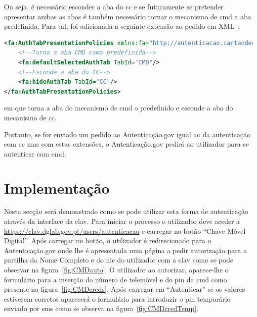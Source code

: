 Ou seja, é necessário esconder a aba do \acrfull{cc} e se futuramente se pretender apresentar ambas as abas é também necessário tornar o mecanismo de \acrfull{cmd} a aba predefinida. Para tal, foi adicionada a seguinte extensão ao pedido em XML~\cite{agov2}:
\begin{lstlisting}[language=xml, caption=Extensão Política de Apresentação no pedido enviado ao Autenticação.gov]
<fa:AuthTabPresentationPolicies xmlns:fa="http://autenticacao.cartaodecidadao.pt/presentationpolicy">
    <!--Torna a aba CMD como predefinida-->
    <fa:defaultSelectedAuthTab TabId="CMD"/>
    <!--Esconde a aba do CC-->
    <fa:hideAuthTab TabId="CC"/> 
</fa:AuthTabPresentationPolicies>
\end{lstlisting}
em que torna a aba do mecanismo de \acrshort{cmd} o predefinido e esconde a aba do mecanismo de \acrshort{cc}.

Portanto, se for enviado um pedido ao Autenticação.gov igual ao da autenticação com \acrshort{cc} mas com estas extensões, o Autenticação.gov pedirá ao utilizador para se autenticar com \acrshort{cmd}.

\section{Implementação}

Nesta secção será demonstrado como se pode utilizar esta forma de autenticação através da interface da \acrshort{clav}. Para iniciar o processo o utilizador deve aceder a \url{https://clav.dglab.gov.pt/users/autenticacao} e carregar no botão ``Chave Móvel Digital''. Após carregar no botão, o utilizador é redirecionado para o Autenticação.gov onde lhe é apresentada uma página a pedir autorização para a partilha do Nome Completo e do \acrshort{nic} do utilizador com a \acrshort{clav} como se pode observar na figura~\ref{fig:CMDauto}. O utilizador ao autorizar, aparece-lhe o formulário para a inserção do número de telemóvel e do \acrshort{pin} da \acrshort{cmd} como presente na figura~\ref{fig:CMDcreds}. Após carregar em ``Autenticar'' se os valores estiverem corretos aparecerá o formulário para introduzir o \acrshort{pin} temporário enviado por \acrshort{sms} como se observa na figura~\ref{fig:CMDcredTemp}.

